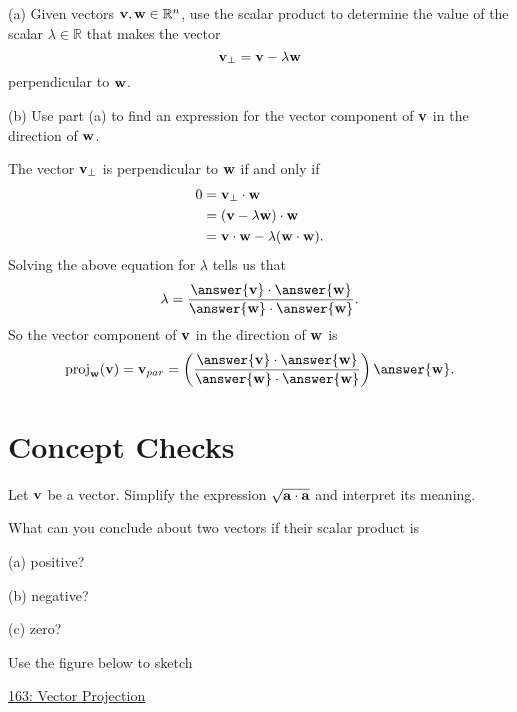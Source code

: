 \documentclass{ximera}
\begin{document}
\begin{question}   \label{Qrasd5r:Scalar}
(a) Given vectors ${\bf v}, {\bf w} \in \mathbb{R}^n$, use the scalar product to determine the value of the scalar $\lambda\in \mathbb{R}$ that makes the vector
\[
     {\bf v}_{\perp} = {\bf v} - \lambda {\bf w}
\]
perpendicular to ${\bf w}$.

(b) Use part (a) to find an expression for the vector component of ${\bf v}$ in the direction of ${\bf w}$.

\begin{explanation}
The vector ${\bf v}_{\perp}$ is perpendicular to ${\bf w}$ if and only if
\begin{align*}
     0        &=   \textbf{v}_{\perp} \cdot \textbf{w}   \\ 
               &= \left( {\bf v} - \lambda {\bf w} \right) \cdot {\bf w} \\
               &= {\bf v}\cdot {\bf w} - \lambda ({\bf w}\cdot {\bf w}) .
\end{align*}
Solving the above equation for $\lambda$ tells us that
\[
    \lambda = \frac{\answer{{\bf v}}\cdot \answer{{\bf w}}}{\answer{{\bf w}}\cdot \answer{{\bf w}}} .
\]
So the vector component of ${\bf v}$ in the direction of ${\bf w}$ is
\[
    \text{proj}_{{\bf w}}({\bf v}) = {\bf v}_{par} = \left(  \frac{\answer{{\bf v}}\cdot \answer{{\bf w}}}{\answer{{\bf w}}\cdot \answer{{\bf w}}}    \right) \answer{\bf w}.
\]
\end{explanation}
\end{question}


\section{Concept Checks}

\begin{question} \label{Q9343525r32}
Let ${\bf v}$ be a vector. Simplify the expression $\sqrt{{\bf a}\cdot {\bf a}}$ and interpret its meaning.
\end{question}

\begin{question}  \label{Qer034234234}
What can you conclude about two vectors if their scalar product is 

(a) positive?

(b) negative?

(c) zero?
\end{question}

\begin{question}  \label{Q3245r432dfg}
Use the figure below to sketch


\begin{onlineOnly}
    \begin{center}
\end{center}
\end{onlineOnly}
 
\href{https://www.geogebra.org/classic/yfe3rqqw}{163: Vector Projection}
 



\end{question}
\end{document}
